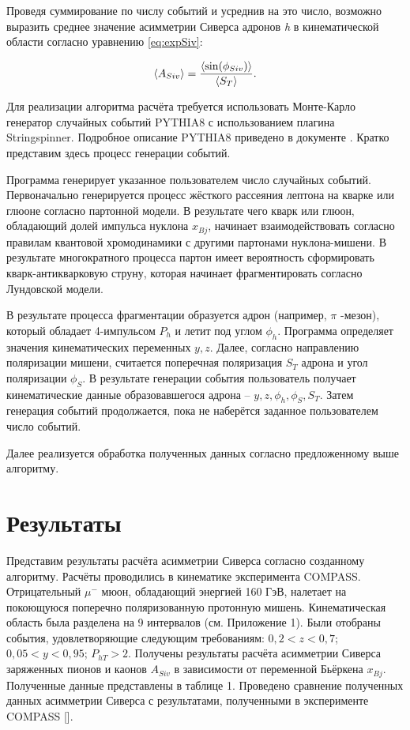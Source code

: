 \documentclass{extreport}
\begin{document}
Проведя суммирование по числу событий и усреднив на это число, возможно выразить среднее значение асимметрии Сиверса адронов \textit{h} в кинематической области согласно уравнению \ref{eq:expSiv}:

\begin{equation}
	\braket{A_{Siv}} = \frac{\braket{\sin (\phi_{Siv})}}{\braket{S_T}}.
\end{equation}

Для реализации алгоритма расчёта требуется использовать Монте-Карло генератор случайных событий PYTHIA8 с использованием плагина Stringspinner. Подробное описание PYTHIA8 приведено в документе \cite{Bierlich_2022}. Кратко представим здесь процесс генерации событий.

Программа генерирует указанное пользователем число случайных событий. Первоначально генерируется процесс жёсткого рассеяния лептона на кварке или глюоне согласно партонной модели. В результате чего кварк или глюон, обладающий долей импульса нуклона $x_{Bj}$, начинает взаимодействовать согласно правилам квантовой хромодинамики с другими партонами нуклона-мишени. В результате многократного процесса партон имеет вероятность сформировать кварк-антикварковую струну, которая начинает фрагментировать согласно Лундовской модели. 

В результате процесса фрагментации образуется адрон (например, $\pi$ -мезон), который обладает 4-импульсом $P_{h}$ и летит под углом $\phi_h$. Программа определяет значения кинематических переменных $y, z$. Далее, согласно направлению поляризации мишени, считается поперечная поляризация $S_T$ адрона и угол поляризации $\phi_S$. В результате генерации события пользователь получает кинематические данные образовавшегося адрона -- $y, z, \phi_h, \phi_S, S_T$. Затем генерация событий продолжается, пока не наберётся заданное пользователем число событий.

Далее реализуется обработка полученных данных согласно предложенному выше алгоритму. 

\section{Результаты}

Представим результаты расчёта асимметрии Сиверса согласно созданному алгоритму.
Расчёты проводились в кинематике эксперимента COMPASS. Отрицательный $\mu^-$ мюон, обладающий энергией 160 ГэВ, налетает на покоющуюся поперечно поляризованную протонную мишень.
Кинематическая область была разделена на 9 интервалов (см. Приложение 1). Были отобраны события, удовлетворяющие следующим требованиям: $0,2 < z < 0,7$; $0,05 < y < 0,95$; $P_{hT} > 2$. Получены результаты расчёта асимметрии Сиверса заряженных пионов и каонов $A_{Siv}$ в зависимости от переменной Бьёркена $x_{Bj}$. Полученные данные представлены в таблице 1. Проведено сравнение полученных данных асимметрии Сиверса с результатами, полученными в эксперименте COMPASS [].  
\end{document}
